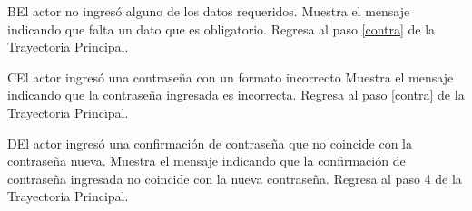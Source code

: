  \begin{UCtrayectoriaA}{B}{El actor no ingresó alguno de los datos requeridos.}
	\UCpaso [\UCactor] Muestra el mensaje  indicando que falta un dato que es obligatorio.
	\UCpaso Regresa al paso \ref{contra} de la Trayectoria Principal.
	
\end{UCtrayectoriaA} 

\begin{UCtrayectoriaA}{C}{El actor ingresó una contraseña con un formato incorrecto}
	\UCpaso [\UCactor] Muestra el mensaje  indicando que la contraseña ingresada es incorrecta.
	\UCpaso Regresa al paso \ref{contra} de la Trayectoria Principal.
	
\end{UCtrayectoriaA} 


\begin{UCtrayectoriaA}{D}{El actor ingresó una confirmación de contraseña que no coincide con la contraseña nueva.}
	\UCpaso [\UCactor] Muestra el mensaje   indicando que la confirmación de contraseña ingresada no coincide con la nueva contraseña.
	\UCpaso Regresa al paso 4 de la Trayectoria Principal.
	
\end{UCtrayectoriaA} 

